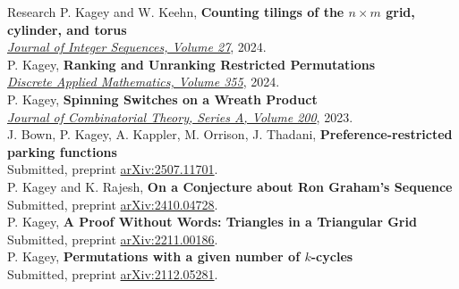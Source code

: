 \documentclass{cv} %
\begin{document}
\begin{rSection}{Research}
  P. Kagey and W. Keehn, \textbf{Counting tilings of the $n \times m$ grid, cylinder, and torus}\\
  \href{https://cs.uwaterloo.ca/journals/JIS/VOL27/Kagey/kagey6.html}{\textit{Journal of Integer Sequences, Volume 27}}, 2024.
  \\
  P. Kagey, \textbf{Ranking and Unranking Restricted Permutations}\\
  \href{https://doi.org/10.1016/j.dam.2024.05.010}{\textit{Discrete Applied Mathematics, Volume 355}}, 2024.
  \\
  P. Kagey, \textbf{Spinning Switches on a Wreath Product} \\
  \href{https://doi.org/10.1016/j.jcta.2023.105795}{\textit{Journal of Combinatorial Theory, Series A, Volume 200}}, 2023.
  \\
  J. Bown, P. Kagey, A. Kappler, M. Orrison, J. Thadani, \textbf{Preference-restricted parking functions}\\
  Submitted, preprint \href{https://arxiv.org/abs/2507.11701}{arXiv:2507.11701}.
  \\
  P. Kagey and K. Rajesh, \textbf{	On a Conjecture about Ron Graham's Sequence} \\
  Submitted, preprint \href{https://arxiv.org/abs/2410.04728}{arXiv:2410.04728}.
  \\
  P. Kagey, \textbf{A Proof Without Words: Triangles in a Triangular Grid} \\
  Submitted, preprint \href{https://arxiv.org/abs/2211.00186}{arXiv:2211.00186}.\\
  P. Kagey, \textbf{Permutations with a given number of $k$-cycles} \\
  Submitted, preprint \href{https://arxiv.org/abs/2112.05281}{arXiv:2112.05281}.\\
\end{rSection}
\end{document}
